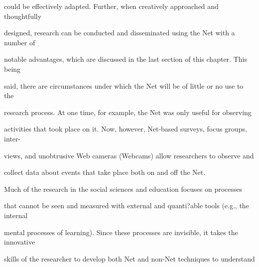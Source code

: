 \documentclass{book}
\begin{document}
\begin{flushleft}
\noindent could be effectively adapted. Further, when creatively approached and thoughtfully

\noindent designed, research can be conducted and disseminated using the Net with a number of

\noindent notable advantages, which are discussed in the last section of this chapter. This being

\noindent said, there are circumstances under which the Net will be of little or no use to the

\noindent research process. At one time, for example, the Net was only useful for observing

\noindent activities that took place on it. Now, however, Net-based surveys, focus groups, inter-

\noindent views, and unobtrusive Web cameras (Webcams) allow researchers to observe and 

\noindent collect data about events that take place both on and off the Net.

\noindent 

\noindent Much of the research in the social sciences and education focuses on processes

\noindent that cannot be seen and measured with external and quanti?able tools (e.g., the internal

\noindent mental processes of learning). Since these processes are invisible, it takes the innovative 

\noindent  skills of the researcher to develop both Net and non-Net techniques to understand

\noindent 
\end{flushleft}
\end{document}

